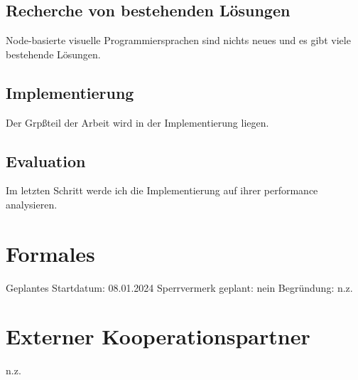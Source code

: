 \documentclass{article}
\begin{document}
\subsection{Recherche von bestehenden Lösungen}

Node-basierte visuelle Programmiersprachen sind nichts neues und es gibt viele bestehende Lösungen.

\subsection{Implementierung}

Der Grpßteil der Arbeit wird in der Implementierung liegen. 

\subsection{Evaluation}

Im letzten Schritt werde ich die Implementierung auf ihrer performance analysieren.


\section{Formales}
Geplantes Startdatum: 08.01.2024
\linebreak
Sperrvermerk geplant: nein
\linebreak
Begründung: n.z.

\section{Externer Kooperationspartner}
n.z.
\end{document}
